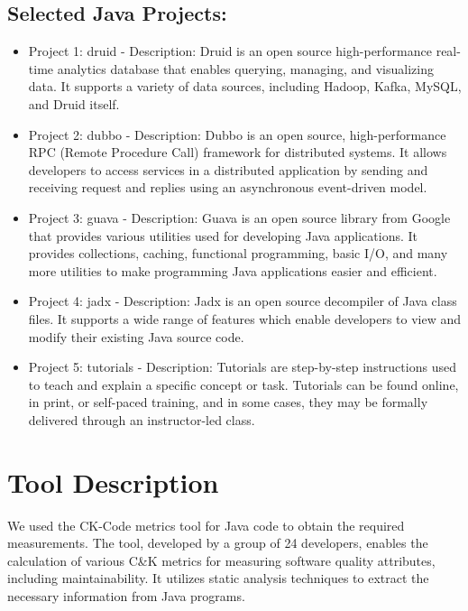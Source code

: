 \documentclass[conference]{IEEEtran}
\begin{document}
	\subsection{Selected Java Projects:}
	\begin{itemize}
		\item Project 1: druid
		- Description: Druid is an open source high-performance real-time analytics database that enables querying, managing, and visualizing data. It supports a variety of data sources, including Hadoop, Kafka, MySQL, and Druid itself.
		
		\item Project 2: dubbo
		- Description: Dubbo is an open source, high-performance RPC (Remote Procedure Call) framework for distributed systems. It allows developers to access services in a distributed application by sending and receiving request and replies using an asynchronous event-driven model.
		
		\item Project 3: guava
		- Description: Guava is an open source library from Google that provides various utilities used for developing Java applications. It provides collections, caching, functional programming, basic I/O, and many more utilities to make programming Java applications easier and efficient.
		
		\item Project 4: jadx
		- Description: Jadx is an open source decompiler of Java class files. It supports a wide range of features which enable developers to view and modify their existing Java source code. 
		
		\item Project 5: tutorials
		- Description: Tutorials are step-by-step instructions used to teach and explain a specific concept or task. Tutorials can be found online, in print, or self-paced training, and in some cases, they may be formally delivered through an instructor-led class.
		
	\end{itemize}
		
	\section{Tool Description}
	We used the CK-Code metrics tool for Java code to obtain the required measurements. The tool, developed by a group of 24 developers, enables the calculation of various C\&K metrics for measuring software quality attributes, including maintainability. It utilizes static analysis techniques to extract the necessary information from Java programs.
	
\end{document}
